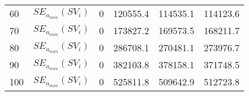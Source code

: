 \begin{table}[H]
\begin{tabular}{l l | l l | l l}
		60                                                          & $SE_{a_{min}}(SV_i)$                                                      & 0                                                                &  120555.4                                                                 & 114535.1                                                         & 114123.6                                                                \\
		70                                                          & $SE_{a_{min}}(SV_i)$                                                      & 0                                                                &  173827.2                                                               & 169573.5                                                         & 168211.7                                                                \\
		80                                                          & $SE_{a_{min}}(SV_i)$                                                      & 0                                                                &  286708.1                                                             & 270481.1                                                         & 273976.7                                                                \\
		90                                                          & $SE_{a_{min}}(SV_i)$                                                      & 0                                                                &  382103.8                                                            & 378158.1                                                         & 371748.5                                                                \\
		100                                                         & $SE_{a_{min}}(SV_i)$                                                      & 0                                                                & 525811.8                                                              & 509642.9                                                         & 512723.8                                                               
	\end{tabular}
\end{table}

